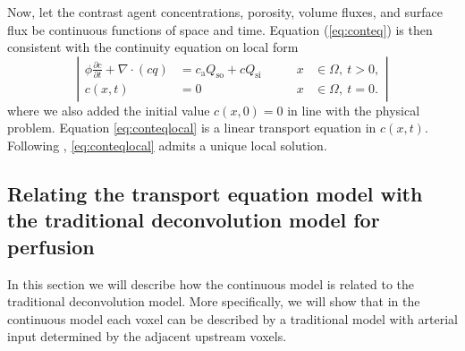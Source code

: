 \documentclass[journal,twocolumn]{IEEEtran}
\newcommand{\Qso}{Q_{\mathrm{so}}}
\newcommand{\Qsi}{Q_{\mathrm{si}}}
\newcommand{\ca}{c_\mathrm{a}}
\begin{document}
	Now, let the contrast agent concentrations, porosity, volume fluxes, and surface flux be continuous functions of space and time. 
	Equation (\ref{eq:conteq}) is then consistent with the continuity equation on local form
	\begin{equation}
		\left\vert
		\begin{alignedat}{2}
			\phi \frac{\partial c}{\partial t} + \nabla \cdot (cq) &= \ca\Qso + c\Qsi \qquad	&x &\in \Omega, \ t>0,  \\
			c(x,t) &= 0 																			 	&x &\in \Omega, \ t=0.
		\end{alignedat}
		\right\vert
		\label{eq:conteqlocal}
	\end{equation}
	where we also added the initial value $c(x,0) = 0$ in line with the physical problem.
	Equation \eqref{eq:conteqlocal} is a linear transport equation in $c(x,t)$. 
	Following \cite{evans98}, \eqref{eq:conteqlocal} admits a unique local solution.


\subsection{Relating the transport equation model with the traditional deconvolution model for perfusion}\label{sec:NewAndOld}
	In this section we will describe how the continuous model is related to the traditional deconvolution model.
	More specifically, we will show that in the continuous model each voxel can be described by a traditional model with arterial input determined by the adjacent upstream voxels.
	
\end{document}
